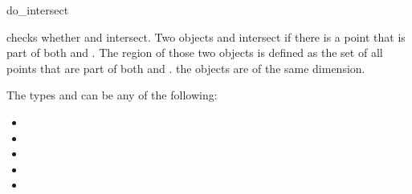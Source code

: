 \begin{ccRefFunction}{do_intersect}

 {checks
  whether  and  intersect.  Two objects
   and  intersect if there is a point
   that is part of both  and .
  The  region of those two objects is
  defined as the set of all points  that are part of both
   and .  \ccPrecond the objects are of
  the same dimension.}

The types  and  can be any of the following:
\begin{itemize}
\item {}
\item {}
\item {}
\item {}
\item {}
\end{itemize}

\ccSeeAlso {}

\end{ccRefFunction}
